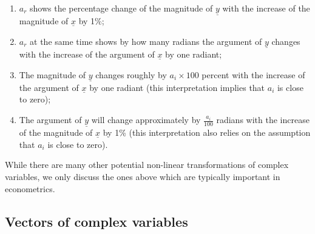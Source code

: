 \documentclass[
]{book}
\providecommand{\tightlist}{%
  \setlength{\itemsep}{0pt}\setlength{\parskip}{0pt}}
\begin{document}
\begin{enumerate}
\def\labelenumi{\arabic{enumi}.}
\tightlist
\item
  \(a_r\) shows the percentage change of the magnitude of \(\underline{y}\) with the increase of the magnitude of \(\underline{x}\) by 1\%;
\item
  \(a_r\) at the same time shows by how many radians the argument of \(\underline{y}\) changes with the increase of the argument of \(\underline{x}\) by one radiant;
\item
  The magnitude of \(\underline{y}\) changes roughly by \(a_i \times 100\) percent with the increase of the argument of \(\underline{x}\) by one radiant (this interpretation implies that \(a_i\) is close to zero);
\item
  The argument of \(\underline{y}\) will change approximately by \(\frac{a_i}{100}\) radians with the increase of the magnitude of \(\underline{x}\) by 1\% (this interpretation also relies on the assumption that \(a_i\) is close to zero).
\end{enumerate}

While there are many other potential non-linear transformations of complex variables, we only discuss the ones above which are typically important in econometrics.

\hypertarget{vectorComplexVariables}{%
\subsection{Vectors of complex variables}\label{vectorComplexVariables}}
\end{document}
